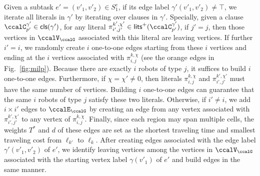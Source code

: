 \documentclass[Afour,sageh,times]{sagej}
\newcommand{\clause}[1]{\mathsf{cls}(#1)}
\renewcommand{\ap}[3]{\mathcal{\pi}_{{#1},{#2}}^{#3}}
\newcounter{phase} \setcounter{phase}{0}
\newcounter{subphase}[phase] \setcounter{subphase}{0}
\begin{document}
Given a subtask $e' = (v'_1, v'_2) \in S_1^e$, if its edge label $\gamma'(v'_1, v'_2) \not=\top$, we iterate all literals in $\gamma'$ by iterating over clauses in $\gamma'$. Specially, given a clause $\ccalC^{\gamma'}_{p'} \in \clause{\gamma'}$, for any literal $\ap{i'}{j'}{k',\chi'} \in\mathsf{lits}^+(\ccalC^{\gamma'}_{p'})$, if $j'=j$, then those vertices in $\ccalV_\ccalG$ associated with this literal are leaving vertices. If further $i'=i$, we randomly create $i$ one-to-one edges starting from these $i$ vertices and ending at the $i$ vertices associated with $\ap{i}{j}{k,\chi}$ (see the orange edges in Fig.~\ref{fig:milp}). Because there are exactly $i$ robots of type $j$, it suffices to build $i$ one-to-one edges. Furthermore, if $\chi=\chi'\neq0$, then literals $\ap{i}{j}{k,\chi}$ and $\ap{i'}{j'}{k',\chi'}$ must have the same number of vertices. Building $i$ one-to-one edges can guarantee that  the same  $i$ robots of type $j$ satisfy these two literals. Otherwise, if $i'\neq i$, we add $i\times i'$ edges to $\ccalE_\ccalG$ by creating an edge from any vertex associated with $\ap{i'}{j'}{k',\chi'}$ to any vertex of $\ap{i}{j}{k,\chi}$. Finally, since each region may span multiple cells, the weights $T^*$ and $d$ of these edges are set as the shortest traveling time and smallest traveling cost from  $\ell_{k'}$ to $\ell_k$. After creating edges  associated with the edge label  $\gamma'(v'_1,v'_2)$ of $e'$, we identify  leaving vertices  among the vertices in $\ccalV_\ccalG$ associated with the starting vertex label $\gamma(v'_1)$ of $e'$ and build edges in the same manner. %


\label{sec:c}
\end{document}

